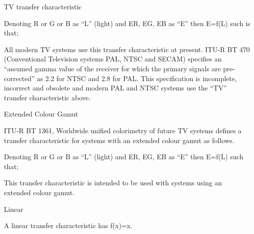 TV transfer characteristic

Denoting R or G or B as “L” (light) and ER, EG, EB as
“E” then E=f(L) such is that;



All modern TV systems use this transfer characteristic at present. ITU-R
BT 470 (Conventional Television systems PAL, NTSC and SECAM) specifies
an “assumed gamma value of the receiver for which the primary
signals are pre-corrected” as 2.2 for NTSC and 2.8 for PAL. This
specification is incomplete, incorrect and obsolete and modern PAL and
NTSC systems use the “TV” transfer characteristic above.


Extended Colour Gamut

ITU-R BT 1361, Worldwide unified colorimetry of future TV systems
defines a transfer characteristic for systems with an extended colour
gamut as follows.

Denoting R or G or B as “L” (light) and ER, EG, EB as
“E” then E=f(L) such that;



This transfer characteristic is intended to be used with systems using
an extended colour gamut.

Linear

A linear transfer characteristic has f(x)=x. 


